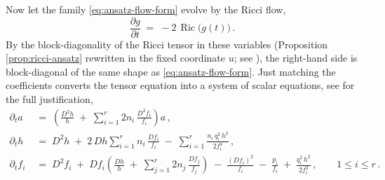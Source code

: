 \documentclass[11pt]{amsart}
\theoremstyle{plain}
\numberwithin{equation}{section}
\newtheorem{proposition}[theorem]{Proposition}
\theoremstyle{definition}
\theoremstyle{remark}
\begin{document}
Now let the family \eqref{eq:ansatz-flow-form} evolve by the Ricci flow,
\[
\frac{\partial g}{\partial t} \;=\; -2\, \operatorname{Ric}\big( g(t) \big) \,.
\]
By the block-diagonality of the Ricci tensor in these variables (Proposition \ref{prop:ricci-ansatz} rewritten in the fixed coordinate $u$; see \cite{FT}), the right-hand side is block-diagonal of the same shape as \eqref{eq:ansatz-flow-form}. Just matching the coefficients converts the tensor equation into a system of scalar equations, see \cite{FT} for the full justification,
\begin{align}
		\partial_t a \;&=\; \left( \frac{D^2 h}{h} \;+\; \sum_{i=1}^r 2 n_i\, \frac{D^2 f_i}{f_i} \right) a \,,\nonumber\\
		\label{eq:flow-system}
		\partial_t h \;&=\; D^2 h \;+\; 2\, Dh \sum_{i=1}^r n_i\, \frac{D f_i}{f_i} \;-\; \sum_{i=1}^r \frac{n_i\, q_i^2\, h^3}{2 f_i^4} \,,\\
		\partial_t f_i \;&=\; D^2 f_i \;+\; D f_i \left( \frac{Dh}{h} \;+\; \sum_{j=1}^r 2 n_j\, \frac{D f_j}{f_j} \right) \;-\; \frac{(D f_i)^2}{f_i} \;-\; \frac{p_i}{f_i} \;+\; \frac{q_i^2\, h^2}{2 f_i^3} \,, \qquad 1 \leq i \leq r \,.\nonumber
\end{align}
\end{document}
